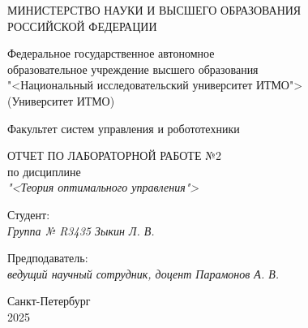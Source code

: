 \thispagestyle{empty}

\begin{center}
    МИНИСТЕРСТВО НАУКИ И ВЫСШЕГО ОБРАЗОВАНИЯ \\ РОССИЙСКОЙ ФЕДЕРАЦИИ

    \vspace{20pt}

    Федеральное государственное автономное \\ образовательное учреждение высшего образования \\
    "<Национальный исследовательский университет ИТМО"> \\
    (Университет ИТМО)

    \vspace{20pt}

    Факультет систем управления и робототехники
\end{center}

\vfill

\begin{center}
    ОТЧЕТ ПО ЛАБОРАТОРНОЙ РАБОТЕ №2\\  
    по дисциплине \\
    \textit{"<Теория оптимального управления">}

    \vspace{20pt}

    
\end{center}

\vfill

    \noindent Студент: \\
    \textit{Группа № R3435 \hfill Зыкин Л. В.}

    \vspace{20pt}

    \noindent Предподаватель: \\
    \textit{ведущий научный сотрудник, доцент \hfill Парамонов А. В.}

\vfill

\begin{center}
    Санкт-Петербург \\ 2025
\end{center}